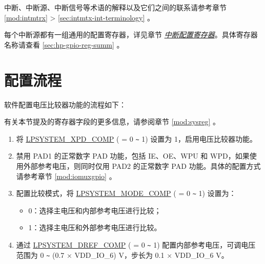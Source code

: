 \documentclass[main\_\_CN.tex]{subfiles}
\begin{document}
\begin{tiplisting}
中断、中断源、中断信号等术语的解释以及它们之间的联系请参考章节 \ref{mod:intmtrx} \textit{} > \ref{sec:intmtx-int-terminology} \textit{}。
\end{tiplisting}

每个中断源都有一组通用的配置寄存器，详见章节 \hyperref[interrupt-config-registers]{\textit{中断配置寄存器}}。具体寄存器名称请查看 \ref{sec:hp-gpio-reg-summ} \textit{}。



\section{配置流程}
\label{sec:anacom-prog-procedures}

软件配置电压比较器功能的流程如下：

\begin{tiplisting}
有关本节提及的寄存器字段的更多信息，请参阅章节 \ref{mod:sysreg} 。
\end{tiplisting}

\begin{enumerate}
    \item 将 \hyperref[fielddesc:LPSYSTEMXPDCOMP0]{LPSYSTEM\_XPD\_COMP} ( = 0 \verb+~+ 1) 设置为 1，启用电压比较器功能。
    \item 禁用 PAD1 的正常数字 PAD 功能，包括 IE、OE、WPU 和 WPD，如果使用外部参考电压，则同时仅用 PAD2 的正常数字 PAD 功能。具体的配置方式请参考章节 \ref{mod:iomuxgpio} 。
    \item 配置比较模式，将 \hyperref[fielddesc:LPSYSTEMMODECOMP0]{LPSYSTEM\_MODE\_COMP} ( = 0 \verb+~+ 1) 设置为：
        \begin{itemize}
            \item 0：选择主电压和内部参考电压进行比较；
            \item 1：选择主电压和外部参考电压进行比较。
        \end{itemize}
    \item 通过 \hyperref[fielddesc:LPSYSTEMDREFCOMP0]{LPSYSTEM\_DREF\_COMP} ( = 0 \verb+~+ 1) 配置内部参考电压，可调电压范围为 0 \verb+~+ (0.7 × VDD\_IO\_6) V，步长为 0.1 × VDD\_IO\_6 V。
\end{enumerate}
\end{document}
